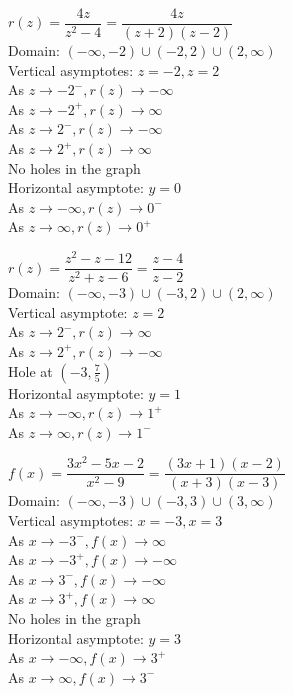 \begin{exenum}
\item $r(z) = \dfrac{4z}{z^{2} -4} = \dfrac{4z}{(z + 2)(z - 2)}$\\
Domain: $(-\infty, -2) \cup (-2, 2) \cup (2, \infty)$\\
Vertical asymptotes: $z = -2, z = 2$\\
As $z \rightarrow -2^{-}, r(z) \rightarrow -\infty$\\
As $z \rightarrow -2^{+}, r(z) \rightarrow \infty$\\
As $z \rightarrow 2^{-}, r(z) \rightarrow -\infty$\\
As $z \rightarrow 2^{+}, r(z) \rightarrow \infty$\\
No holes in the graph\\
Horizontal asymptote: $y = 0$ \\
As $z \rightarrow -\infty, r(z) \rightarrow 0^{-}$\\
As $z \rightarrow \infty, r(z) \rightarrow 0^{+}$\\

\item $r(z) = \dfrac{z^2-z-12}{z^{2} +z - 6} = \dfrac{z-4}{z - 2}$\\
Domain: $(-\infty, -3) \cup (-3, 2) \cup (2, \infty)$\\
Vertical asymptote: $z = 2$\\
As $z \rightarrow 2^{-}, r(z) \rightarrow \infty$\\
As $z \rightarrow 2^{+}, r(z) \rightarrow -\infty$\\
Hole at $\left(-3, \frac{7}{5} \right)$ \\
Horizontal asymptote: $y = 1$ \\
As $z \rightarrow -\infty, r(z) \rightarrow 1^{+}$\\
As $z \rightarrow \infty, r(z) \rightarrow 1^{-}$\\

\item $f(x) = \dfrac{3x^2-5x-2}{x^{2} -9} = \dfrac{(3x+1)(x-2)}{(x + 3)(x - 3)}$\\
Domain: $(-\infty, -3) \cup (-3, 3) \cup (3, \infty)$\\
Vertical asymptotes: $x = -3, x = 3$\\
As $x \rightarrow -3^{-}, f(x) \rightarrow \infty$\\
As $x \rightarrow -3^{+}, f(x) \rightarrow -\infty$\\
As $x \rightarrow 3^{-}, f(x) \rightarrow -\infty$\\
As $x \rightarrow 3^{+}, f(x) \rightarrow \infty$\\
No holes in the graph\\
Horizontal asymptote: $y = 3$ \\
As $x \rightarrow -\infty, f(x) \rightarrow 3^{+}$\\
As $x \rightarrow \infty, f(x) \rightarrow 3^{-}$\\


\end{exenum}
